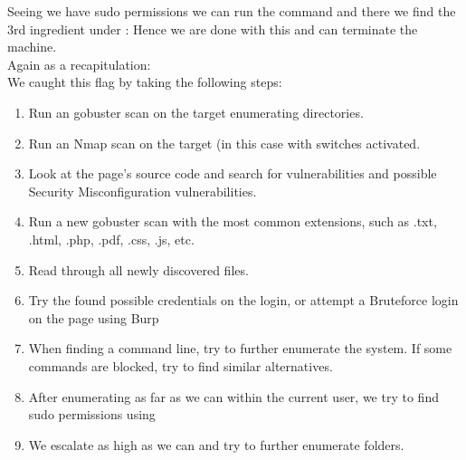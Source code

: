 Seeing we have sudo permissions we can run the command  and there we find the 3rd ingredient under :
Hence we are done with this and can terminate the machine.\\


Again as a recapitulation:\\
We caught this flag by taking the following steps:
\label{Stepwise_WriteUp_Web_Hacking}
\begin{enumerate}
\item Run an gobuster scan on the target enumerating directories.
\item Run an Nmap scan on the target (in this case with  switches activated.
\item Look at the page's source code and search for vulnerabilities and possible Security Misconfiguration vulnerabilities.
\item Run a new gobuster scan with the most common extensions, such as .txt, .html, .php, .pdf, .css, .js, etc.
\item Read through all newly discovered files.
\item Try the found possible credentials on the login, or attempt a Bruteforce login on the page using Burp
\item When finding a command line, try to further enumerate the system. If some commands are blocked, try to find similar alternatives.
\item After enumerating as far as we can within the current user, we try to find sudo permissions using 
\item We escalate as high as we can and try to further enumerate folders.
\end{enumerate}